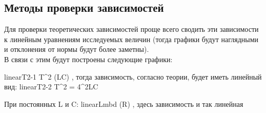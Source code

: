 \subsection {Методы проверки зависимостей}

Для проверки теоретических зависимостей проще всего сводить эти зависимости к линейным уравнениям исследуемых величин (тогда графики будут наглядными и отклонения от нормы будут более заметны). \\

\noindent В связи с этим будут построены следующие графики:

\formula
{}
{linearT2-1}
{T^2 (LC) \quad,}
\formula
{тогда зависимость, согласно теории, будет иметь линейный вид:}
{linearT2-2}
{T^2 = 4\pi^2LC}

\formula
{При постоянных L и C:}
{linearLmbd}
{\lambda(R) \quad,}
здесь зависимость и так линейная